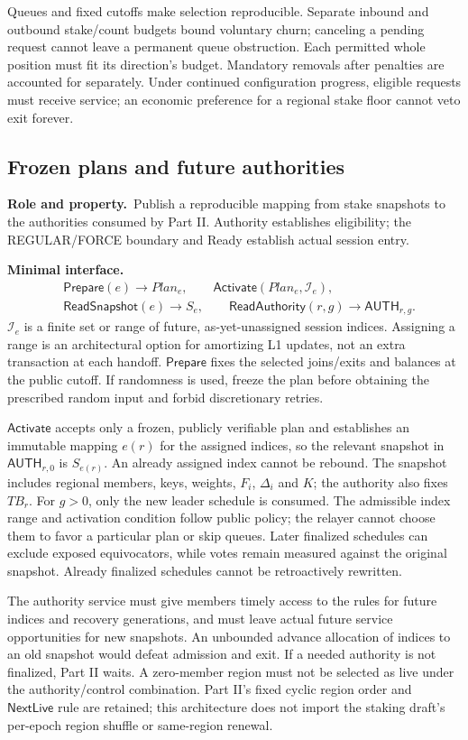 \documentclass[11pt,a4paper]{article}
\newcommand{\api}[1]{\ensuremath{\mathsf{#1}}}
\newcommand{\TB}{\mathit{TB}}
\newcommand{\role}{\textbf{Role and property.}\ }
\newcommand{\iface}{\textbf{Minimal interface.}\ }
\begin{document}
Queues and fixed cutoffs make selection reproducible. Separate inbound
and outbound stake/count budgets bound voluntary churn; canceling a
pending request cannot leave a permanent queue obstruction. Each permitted
whole position must fit its direction's budget. Mandatory removals after
penalties are accounted for separately. Under continued configuration
progress, eligible requests must receive service; an economic preference
for a regional stake floor cannot veto exit forever.

\subsection{Frozen plans and future authorities}\label{sec:authority}
\role Publish a reproducible mapping from stake snapshots to the
authorities consumed by Part II. Authority establishes eligibility;
the REGULAR/FORCE boundary and Ready establish actual session entry.

\iface
\[
\begin{aligned}
 &\api{Prepare}(e)\to\mathit{Plan}_e,\qquad
   \api{Activate}(\mathit{Plan}_e,\mathcal I_e),\\
 &\api{ReadSnapshot}(e)\to S_e,\qquad
   \api{ReadAuthority}(r,g)\to\api{AUTH}_{r,g}.
\end{aligned}
\]
$\mathcal I_e$ is a finite set or range of future, as-yet-unassigned
session indices. Assigning a range is an architectural option for
amortizing L1 updates, not an extra transaction at each handoff.
\api{Prepare} fixes the selected joins/exits and balances at the public
cutoff. If randomness is used, freeze the plan before obtaining the
prescribed random input and forbid discretionary retries.

\api{Activate} accepts only a frozen, publicly verifiable plan and
establishes an immutable mapping $e(r)$ for the assigned indices, so
the relevant snapshot in $\api{AUTH}_{r,0}$ is $S_{e(r)}$.
An already assigned index cannot be rebound. The snapshot includes
regional members, keys, weights, $F_i$, $\Delta_i$ and $K$; the authority
also fixes $\TB_r$. For $g>0$, only the new leader schedule is consumed.
The admissible index range and activation condition follow public policy;
the relayer cannot choose them to favor a particular plan or skip queues.
Later finalized schedules can exclude exposed equivocators, while votes
remain measured against the original snapshot. Already finalized
schedules cannot be retroactively rewritten.

The authority service must give members timely access to the rules for
future indices and recovery generations, and must leave actual future
service opportunities for new snapshots. An unbounded advance allocation
of indices to an old snapshot would defeat admission and exit. If a needed
authority is not finalized, Part II waits. A zero-member region must not
be selected as live under the authority/control combination. Part II's
fixed cyclic region order and \api{NextLive} rule are retained; this
architecture does not import the staking draft's per-epoch region shuffle
or same-region renewal.
\end{document}
